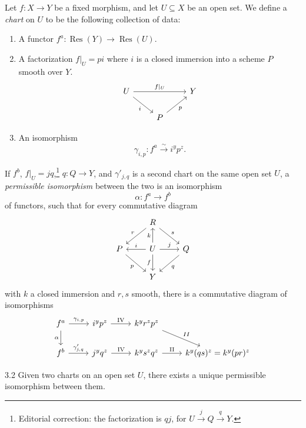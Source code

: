 \begin{definition*}
Let $f\colon X\to Y$ be a fixed morphism, and let $U\subseteq X$ be an open set. We define a \emph{chart} on $U$ to be the following collection of data:
\begin{enumerate}
\item[1)] A functor $f^{a}\colon \operatorname{Res}(Y)\to \operatorname{Res}(U)$.
\item[2)] A factorization $f|_{U} = pi$ where $i$ is a closed immersion into a scheme $P$ smooth over $Y$.
\[
\begin{tikzcd}
U \ar[rr,"f|_{U}"] \ar[dr,"i"'] & & Y \\
& P \ar[ur,"p"']
\end{tikzcd}
\]
\item[3)] An isomorphism
\[
\gamma_{i,p}\colon f^{a} \xrightarrow{\sim} i^{y}p^{z}.
\]
\end{enumerate}
\end{definition*}

\begin{definition*}
If $f^{b}$, $f|_{U} = jq$,\footnote{Editorial correction: the factorization is $qj$, for $U\xrightarrow{j}Q\xrightarrow{q}Y$.} $q\colon Q\to Y$, and $\gamma'_{j,q}$ is a second chart on the same open set $U$, a \emph{permissible isomorphism} between the two is an isomorphism
\[
\alpha\colon f^{a} \longrightarrow f^{b}
\]
of functors, such that for every commutative diagram
\[
\begin{tikzcd}
	& R \arrow[ld, "r"'] \arrow[rd, "s"] & \\
	P \arrow[rd, "p"'] & U \arrow[l, "i"'] \arrow[r, "j"] \arrow[u, "k"] \arrow[d, "f"'] & Q \arrow[ld, "q"] \\
	& Y &
\end{tikzcd}
\]
with $k$ a closed immersion and $r,s$ smooth, there is a commutative diagram of isomorphisms
\[
\begin{tikzcd}
f^{a} \ar[r,"\gamma_{i,p}"] \ar[d,"\alpha"'] & i^{y}p^{z} \ar[r,"\mathrm{IV}"] & k^{y}r^{z}p^{z}\ar[dr,"II"] \\
f^{b} \ar[r,"\gamma'_{j,q}"] & j^{y}q^{z} \ar[r,"\mathrm{IV}"] & k^{y}s^{z}q^{z} \ar[r,"\mathrm{II}"] & k^{y}(qs)^{z} = k^{y}(pr)^{z}
\end{tikzcd}
\]
\end{definition*}

\par\endgroup

\begingroup
\setlength{\emergencystretch}{2em}
\begin{booklemma}{3.2}\label{lem:6.3.2}
Given two charts on an open set $U$, there exists a unique permissible isomorphism between them.
\end{booklemma}

